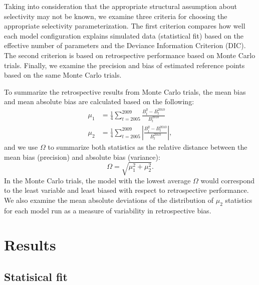 \documentclass[review,letterpaper,10pt,authoryear]{elsarticle}
\begin{document}
Taking into consideration that the appropriate structural assumption about selectivity may not be known, we examine three criteria for choosing the appropriate selectivity parameterization.  The first criterion compares how well each model configuration explains simulated data (statistical fit) based on the effective number of parameters and the  Deviance Information Criterion (DIC).  The second criterion is based on retrospective performance based on Monte Carlo trials. Finally, we examine the precision and bias of estimated reference points based on the same Monte Carlo trials.

To summarize the retrospective results from Monte Carlo trials, the mean bias and mean absolute bias are calculated based on the following:
\begin{align}
    \mu_1   &= \frac{1}{4} \sum_{t=2005}^{2009} \frac{B_t^y-B_t^{2010}}{B_t^{2010}}\label{eq:5}\\
    \mu_2 &= \frac{1}{4} \sum_{t=2005}^{2009}\left| \frac{B_t^y-B_t^{2010}}{B_t^{2010}}\right|, \label{eq:6}
\end{align}
and we use $\Omega$ to summarize both statistics as the relative distance between the mean bias (precision) and absolute bias (variance):
\begin{equation} \label{eq:7}
    \Omega = \sqrt{\mu_1^2 + \mu_2^2 }.	
\end{equation}
In the Monte Carlo trials, the model with the lowest average $\Omega$ would correspond to the least variable and least biased with respect to retrospective performance.  We also examine the mean absolute deviations of the distribution of $\mu_2$ statistics for each model run as a measure of variability in retrospective bias. %









\section*{Results} %
\label{sec:results}

\subsection*{Statisical fit} %
\label{sub:statisical_fit}
\end{document}
